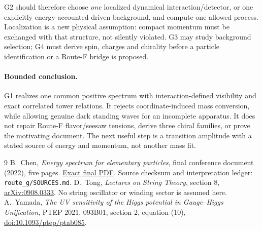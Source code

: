 \documentclass[11pt,a4paper]{article}
\begin{document}
G2 should therefore choose \emph{one} localized dynamical
interaction/detector, or one explicitly energy-accounted driven
background, and compute one allowed process. Localization is a new
physical assumption: compact momentum must be exchanged with that
structure, not silently violated. G3 may study background selection;
G4 must derive spin, charges and chirality before a particle
identification or a Route-F bridge is proposed.

\paragraph{Bounded conclusion.}
G1 realizes one common positive spectrum with interaction-defined
visibility and exact correlated tower relations. It rejects
coordinate-induced mass conversion, while allowing genuine dark
standing waves for an incomplete apparatus. It does not repair
Route-F flavor/seesaw tensions, derive three chiral families, or prove
the motivating document. The next useful step is a transition
amplitude with a stated source of energy and momentum, not another
mass fit.

\begin{thebibliography}{9}
B.~Chen, \emph{Energy spectrum for elementary particles}, final
conference document (2022), five pages.
\href{https://indico.cern.ch/event/1109513/contributions/4969967/attachments/2480973/4410560/Energy%20spectrum%20for%20elementary%20particles_final.pdf}{Exact final PDF}.
Source checksum and interpretation ledger: \texttt{route\_g/SOURCES.md}.
D.~Tong, \emph{Lectures on String Theory}, section 8,
\href{https://arxiv.org/html/0908.0333v3#S8}{arXiv:0908.0333}.
No string oscillator or winding sector is assumed here.
A.~Yamada, \emph{The UV sensitivity of the Higgs potential in
Gauge--Higgs Unification}, PTEP 2021, 093B01, section 2, equation (10),
\href{https://doi.org/10.1093/ptep/ptab085}{doi:10.1093/ptep/ptab085}.
\end{thebibliography}
\end{document}
